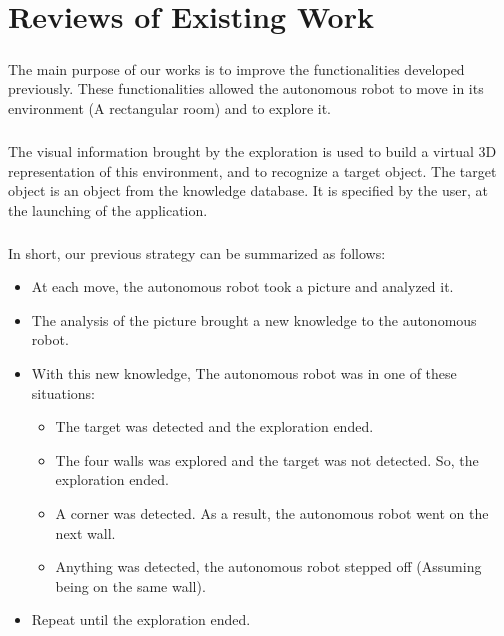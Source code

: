 \documentclass[12pt]{report}
\begin{document}
	
    \chapter{Reviews of Existing Work}
	
	\paragraph{}
	The main purpose of our works is to improve the functionalities developed previously. These functionalities allowed the autonomous robot to move in its environment (A rectangular room) and to explore it. 
	
	\paragraph{}
	The visual information brought by the exploration is used to build a virtual 3D representation of this environment, and to recognize a target object. The target object is an object from the knowledge database. It is specified by the user, at the launching of the application.
	
	\paragraph{}
	In short, our previous strategy can be summarized as follows:
	\begin{itemize}
		\item At each move, the autonomous robot took a picture and analyzed it.
		\item The analysis of the picture brought a new knowledge to the autonomous robot.
		\item With this new knowledge, The autonomous robot was in one of these situations:
		\begin{itemize}
			\item The target was detected and the exploration ended.
			\item The four walls was explored and the target was not detected. So, the exploration ended.
			\item A corner was detected. As a result, the autonomous robot went on the next wall.
			\item Anything was detected, the autonomous robot stepped off (Assuming being on the same wall).
		\end{itemize}
		\item Repeat until the exploration ended.
	\end{itemize}
\end{document}
